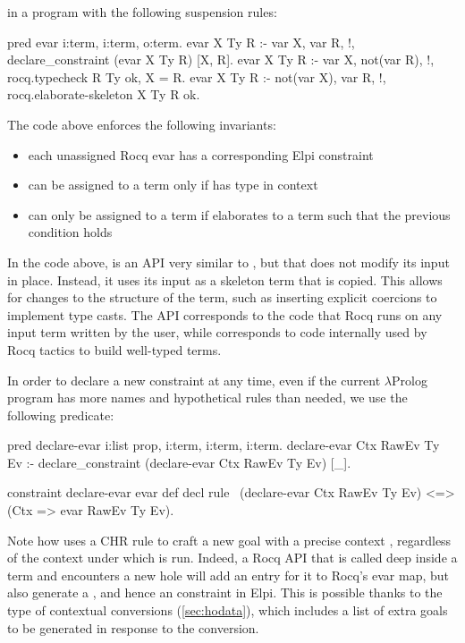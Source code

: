\documentclass{these-ISSS}
\newenvironment{elpicode}
  {\VerbatimEnvironment\begin{elpibox}\begin{xelpicode}}{\end{xelpicode}
\end{elpibox}}
\begin{document}
\noindent in a program with the following suspension rules:

\begin{elpicode}
pred evar i:term, i:term, o:term. %
evar X Ty R :- var X, var R,      !,
  declare_constraint (evar X Ty R) [X, R].
evar X Ty R :- var X, not(var R), !,
  rocq.typecheck R Ty ok, X = R.
evar X Ty R :- not(var X), var R, !,
  rocq.elaborate-skeleton X Ty R ok.
\end{elpicode}

\noindent
The code above enforces the following invariants:

\begin{itemize}
  \item each unassigned Rocq evar has a corresponding Elpi constraint
  \item {} can be assigned to a term  only if
         has type  in context 
  \item {} can only be assigned to a term  if
         elaborates to a term  such that
        the previous condition holds
\end{itemize}

\noindent
In the code above,  is an API very similar to
, but that does not modify its input in place. Instead, it
uses its input as a skeleton term that is copied. This allows for changes to
the structure of the term, such as inserting explicit coercions to implement
type casts. The API corresponds to the code that Rocq runs on any input term
written by the user, while  corresponds to code
internally used by Rocq tactics to build well-typed terms.

In order to declare a new  constraint at any time, even if the
current $\lambda$Prolog program has more names and hypothetical rules than
needed, we use the following predicate:

\begin{elpicode}
pred declare-evar i:list prop, i:term, i:term, i:term.
declare-evar Ctx RawEv Ty Ev :-
  declare_constraint (declare-evar Ctx RawEv Ty Ev) [_].

constraint declare-evar evar def decl {
  rule \ (declare-evar Ctx RawEv Ty Ev) <=> (Ctx => evar RawEv Ty Ev).
}
\end{elpicode}

\noindent
Note how  uses a CHR rule to craft a new goal with a
precise context , regardless of the context under which
 is run. Indeed, a Rocq API that is called deep
inside a term and encounters a new hole will add an entry for it to Rocq's
evar map, but also generate a , and hence an 
constraint in Elpi. This is possible thanks to the type of contextual
conversions (\cref{sec:hodata}), which includes a list of extra goals to be generated in response
to the conversion.
\end{document}
